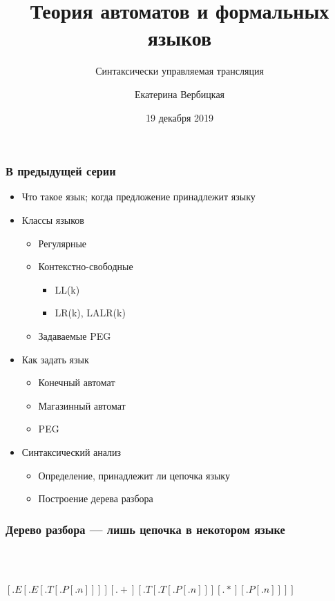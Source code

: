 \documentclass{beamer}
\title[]{Теория автоматов и формальных языков}
\subtitle[]{Синтаксически управляемая трансляция}
\institute[]{
Санкт-Петербургский государственный электротехнический университет <<ЛЭТИ>>\\
}
\author[]{Екатерина Вербицкая}
\date{19 декабря 2019}
\begin{document}
{
  \begin{frame}
    \titlepage
  \end{frame}
}

\begin{frame}[fragile]
  \transwipe[direction=90]
  \frametitle{В предыдущей серии}
  \begin{itemize}
    \item Что такое язык; когда предложение принадлежит языку
    \item Классы языков
    \begin{itemize}
	  \item Регулярные
	  \item Контекстно-свободные
	  \begin{itemize}
	    \item LL(k)
	    \item LR(k), LALR(k)
	  \end{itemize}
	  \item Задаваемые PEG   
    \end{itemize}     
    \item Как задать язык
    \begin{itemize}
      \item Конечный автомат
      \item Магазинный автомат
      \item PEG
    \end{itemize}
    \item Синтаксический анализ
    \begin{itemize}
      \item Определение, принадлежит ли цепочка языку
      \item Построение дерева разбора
    \end{itemize}
  \end{itemize}
\end{frame}

\begin{frame}[fragile]
  \transwipe[direction=90]
  \frametitle{Дерево разбора --- лишь цепочка в некотором языке }
\begin{center}
  \pause
  
  ~\\~
  
$[.E [.E [.T [.P [.n ] ] ] ] [.+ ] [.T [.T [.P [.n ] ] ] [.* ] [.P [.n ] ] ] ]$  
\end{center}  
\end{frame}
\end{document}
